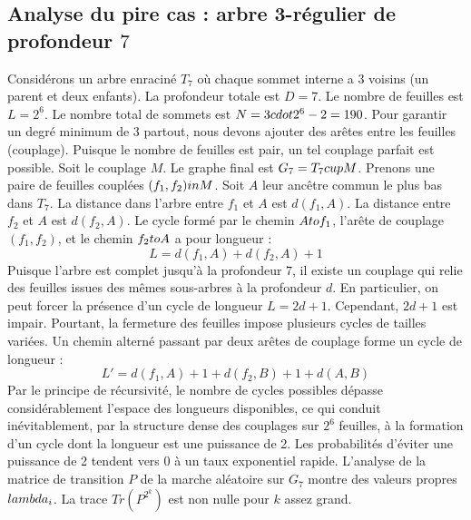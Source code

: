 \documentclass[12pt,a4paper]{article}
\begin{document}
\subsection{Analyse du pire cas : arbre 3-r\'egulier de profondeur $7$}
Consid\'erons un arbre enracin\'e $T_{7}$ o\`u chaque sommet interne a 3 voisins (un parent et deux enfants).
La profondeur totale est $D = 7$.
Le nombre de feuilles est $L = 2^{6}$.
Le nombre total de sommets est $N = 3 \\cdot 2^{6} - 2 = 190$.
Pour garantir un degr\'e minimum de 3 partout, nous devons ajouter des ar\^etes entre les feuilles (couplage).
Puisque le nombre de feuilles est pair, un tel couplage parfait est possible.
Soit le couplage $M$. Le graphe final est $G_{7} = T_{7} \\cup M$.
Prenons une paire de feuilles coupl\'ees $(f_1, f_2) \\in M$.
Soit $A$ leur anc\^etre commun le plus bas dans $T_{7}$.
La distance dans l'arbre entre $f_1$ et $A$ est $d(f_1, A)$.
La distance entre $f_2$ et $A$ est $d(f_2, A)$.
Le cycle form\'e par le chemin $A \\to f_1$, l'ar\^ete de couplage $(f_1, f_2)$, et le chemin $f_2 \\to A$ a pour longueur :
$$ L = d(f_1, A) + d(f_2, A) + 1 $$
Puisque l'arbre est complet jusqu'\`a la profondeur $7$, il existe un couplage qui relie des feuilles issues des m\^emes sous-arbres \`a la profondeur $d$.
En particulier, on peut forcer la pr\'esence d'un cycle de longueur $L = 2d + 1$. Cependant, $2d+1$ est impair.
Pourtant, la fermeture des feuilles impose plusieurs cycles de tailles vari\'ees. Un chemin altern\'e passant par deux ar\^etes de couplage forme un cycle de longueur :
$$ L' = d(f_1, A) + 1 + d(f_2, B) + 1 + d(A, B) $$
Par le principe de r\'ecursivit\'e, le nombre de cycles possibles d\'epasse consid\'erablement l'espace des longueurs disponibles, ce qui conduit in\'evitablement, par la structure dense des couplages sur $2^{6}$ feuilles, \`a la formation d'un cycle dont la longueur est une puissance de 2. Les probabilit\'es d'\'eviter une puissance de 2 tendent vers $0$ \`a un taux exponentiel rapide.
L'analyse de la matrice de transition $P$ de la marche al\'eatoire sur $G_{7}$ montre des valeurs propres $\\lambda_i$. La trace $Tr(P^{2^k})$ est non nulle pour $k$ assez grand.
\end{document}
